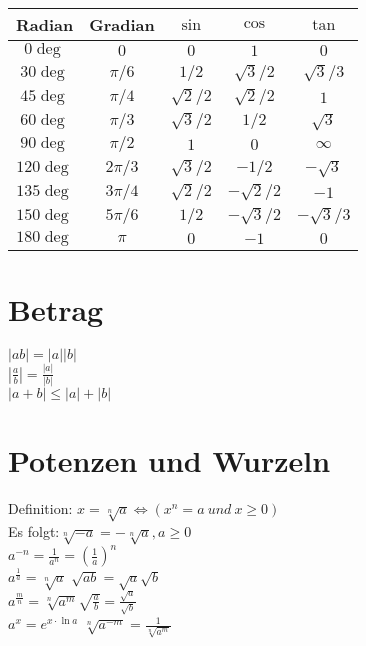   \begin{example} $ $\\
  	\renewcommand{\arraystretch}{1.2}
  	\begin{tabular}{| c | c || c | c | c |}
  			\hline
        Radian & Gradian & $\sin$ & $\cos$ & $\tan$ \\
        	\hline
        $0\deg$ & $0$ & $0$ & $1$ & $0$ \\
        	\hline
        $30\deg$ & $\pi/6$ & $1/2$ & $\sqrt{3}/2$ & $\sqrt{3}/3$ \\
        	\hline
        $45\deg$ & $\pi/4$ & $\sqrt{2}/2$ & $\sqrt{2}/2$ & $1$ \\
        	\hline
        $60\deg$ & $\pi/3$ & $\sqrt{3}/2$ & $1/2$ & $\sqrt{3}$ \\
        	\hline
        $90\deg$ & $\pi/2$ & $1$ & $0$ & $\infty$ \\
        	\hline
        $120\deg$ & $2\pi/3$ & $\sqrt{3}/2$ & $-1/2$ & $-\sqrt{3}$ \\
        	\hline
        $135\deg$ & $3\pi/4$ & $\sqrt{2}/2$ & $-\sqrt{2}/2$ & $-1$ \\
        	\hline
        $150\deg$ & $5\pi/6$ & $1/2$ & $-\sqrt{3}/2$ & $-\sqrt{3}/3$ \\
        	\hline
        $180\deg$ & $\pi$ & $0$ & $-1$ & $0$ \\
        	\hline
  	\end{tabular}
  \end{example}

    \section{Betrag}
	
	$|ab|=|a||b|$\\
    $|\frac{a}{b}|=\frac{|a|}{|b|}$\\
	$|a+b|\leq |a|+|b|$
	
	
	\section{Potenzen und Wurzeln}
    
	Definition: $x= \sqrt[n]{a} \Leftrightarrow (x^n = a \ und \ x\geq 0)$\\
	Es folgt:$\sqrt[n]{-a}=-\sqrt[n]{a}, a \geq 0$\\
	$a^{-n} = \frac{1}{a^n}= (\frac{1}{a})^n$\\
	$a^{\frac{1}{a}}= \sqrt[n]{a}$ \tab $\sqrt{ab}=\sqrt{a}\sqrt{b}$\\
	$a^{\frac{m}{n}}= \sqrt[n]{a^m}$\tab $\sqrt{\frac{a}{b}}= \frac{\sqrt{a}}{\sqrt{b}}$\\
	$a^x= e^{x\cdot \ln a}$ \tab $\sqrt[n]{a^{-m}}= \frac{1}{\sqrt[n]{a^m}}$
	

